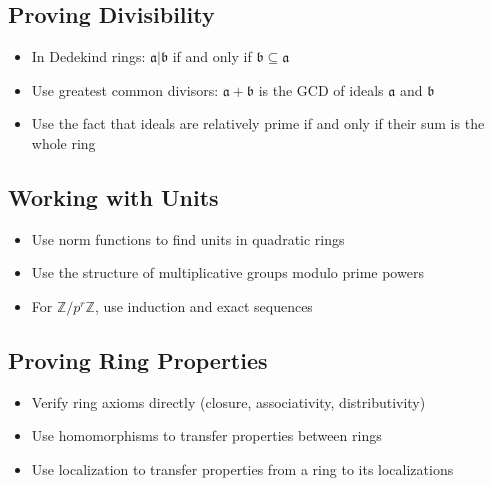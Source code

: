 \subsection*{Proving Divisibility}
\begin{itemize}
\item In Dedekind rings: $\mathfrak{a} | \mathfrak{b}$ if and only if $\mathfrak{b} \subseteq \mathfrak{a}$
\item Use greatest common divisors: $\mathfrak{a} + \mathfrak{b}$ is the GCD of ideals $\mathfrak{a}$ and $\mathfrak{b}$
\item Use the fact that ideals are relatively prime if and only if their sum is the whole ring
\end{itemize}

\subsection*{Working with Units}
\begin{itemize}
\item Use norm functions to find units in quadratic rings
\item Use the structure of multiplicative groups modulo prime powers
\item For $\mathbb{Z}/p^r\mathbb{Z}$, use induction and exact sequences
\end{itemize}

\subsection*{Proving Ring Properties}
\begin{itemize}
\item Verify ring axioms directly (closure, associativity, distributivity)
\item Use homomorphisms to transfer properties between rings
\item Use localization to transfer properties from a ring to its localizations
\end{itemize}
